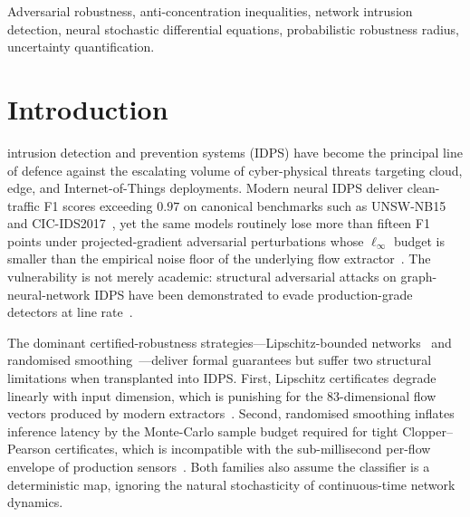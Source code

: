 \documentclass{ieeeaccess}
\begin{document}
\begin{keywords}
Adversarial robustness, anti-concentration inequalities, network intrusion
detection, neural stochastic differential equations, probabilistic
robustness radius, uncertainty quantification.
\end{keywords}

\titlepgskip=-21pt

\maketitle

\section{Introduction}\label{sec:intro}
 intrusion detection and prevention systems
(IDPS) have become the principal line of defence against the escalating
volume of cyber-physical threats targeting cloud, edge, and
Internet-of-Things deployments. Modern neural IDPS deliver clean-traffic
F1 scores exceeding $0.97$ on canonical benchmarks such as UNSW-NB15
and CIC-IDS2017~\cite{wu2022rtids,halbouni2022cnnlstm}, yet the same
models routinely lose more than fifteen F1 points under
projected-gradient adversarial perturbations whose $\ell_\infty$ budget
is smaller than the empirical noise floor of the underlying flow
extractor~\cite{ennaji2024advsurvey,vitorino2024advbench}. The
vulnerability is not merely academic: structural adversarial attacks on
graph-neural-network IDPS have been demonstrated to evade
production-grade detectors at line rate~\cite{venturi2024structural}.

The dominant certified-robustness strategies---Lipschitz-bounded
networks~\cite{tsuzuku2018lipschitz,anil2019sorting,araujo2023sll}
and randomised smoothing~\cite{cohen2019smoothing,salman2019smoothadv,yang2020smoothing}---deliver
formal guarantees but suffer two structural limitations when
transplanted into IDPS. First, Lipschitz certificates degrade linearly
with input dimension, which is punishing for the $83$-dimensional flow
vectors produced by modern extractors~\cite{anil2019sorting}. Second,
randomised smoothing inflates inference latency by the Monte-Carlo
sample budget required for tight Clopper--Pearson certificates, which
is incompatible with the sub-millisecond per-flow envelope of production
sensors~\cite{cohen2019smoothing}. Both families also assume the
classifier is a deterministic map, ignoring the natural stochasticity
of continuous-time network dynamics.
\end{document}
